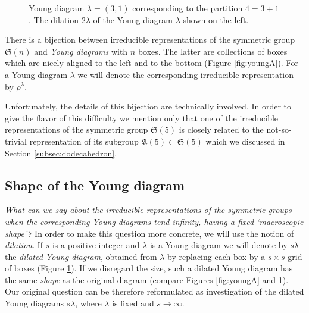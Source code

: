 \documentclass{emsprocart}
\theoremstyle{definition}
\begin{document}
\begin{figure}[t]
{
\label{fig:youngB}
}

\caption{\protect{} Young diagram $\lambda=(3,1)$ corresponding to the partition $4=3+1$. 
\protect{}
The dilation $2\lambda$ of the Young diagram $\lambda$ shown on the left.}
\end{figure}

There is a bijection between irreducible representations of
the symmetric group ${\mathfrak{S}({n})}$ and \emph{Young diagrams} with $n$ boxes. The latter are 
collections of boxes which are nicely aligned to the left and
to the bottom (Figure \ref{fig:youngA}). For a Young diagram $\lambda$ we will denote the corresponding irreducible
representation by $\rho^\lambda$.

Unfortunately, the details of this bijection are technically involved. In order to give 
the flavor of this difficulty we mention only that one of the irreducible representations of the symmetric group
${\mathfrak{S}({5})}$ is closely related to the not-so-trivial representation of its subgroup ${\mathfrak{A}({5})}\subset{\mathfrak{S}({5})}$ which we discussed in Section \ref{subsec:dodecahedron}.

\subsection{Shape of the Young diagram}

\emph{What can we say about the irreducible representations
of the symmetric groups when the corresponding Young diagrams tend infinity, having a fixed `macroscopic shape'?}
In order to make this question more concrete, we will use the notion of \emph{dilation}.
If $s$ is a positive integer and $\lambda$ is a Young diagram we will denote by $s\lambda$ the 
\emph{dilated Young diagram}, obtained from $\lambda$ by replacing each box by a $s\times s$ grid of boxes (Figure \ref{fig:youngB}). 
If we disregard the size, such a dilated Young diagram has the same \emph{shape}
as the original diagram (compare Figures \ref{fig:youngA} and \ref{fig:youngB}). 
Our original question can be therefore reformulated as investigation of the dilated Young diagrams $s\lambda$, where $\lambda$ is fixed and $s\to\infty$.
\end{document}
